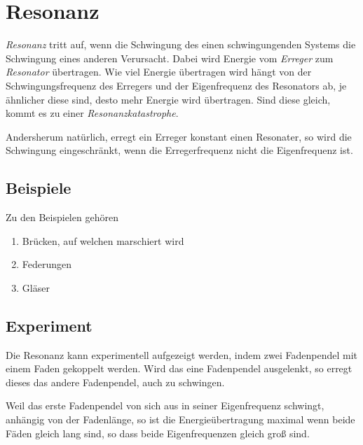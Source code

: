 \documentclass{article}
\begin{document}
\section{Resonanz}
\emph{Resonanz} tritt auf, wenn die Schwingung des einen schwingungenden Systems die Schwingung eines anderen Verursacht. Dabei wird Energie vom \emph{Erreger} zum \emph{Resonator} übertragen. Wie viel Energie übertragen wird hängt von der Schwingungsfrequenz des Erregers und der Eigenfrequenz des Resonators ab, je ähnlicher diese sind, desto mehr Energie wird übertragen. Sind diese gleich, kommt es zu einer \emph{Resonanzkatastrophe}.
 
Andersherum natürlich, erregt ein Erreger konstant einen Resonater, so wird die Schwingung eingeschränkt, wenn die Erregerfrequenz nicht die Eigenfrequenz ist.
 
\subsection{Beispiele}
Zu den Beispielen gehören
\begin{enumerate}
 \item Brücken, auf welchen marschiert wird 
 \item Federungen
 \item Gläser 
\end{enumerate}
 
\subsection{Experiment}
Die Resonanz kann experimentell aufgezeigt werden, indem zwei Fadenpendel mit einem Faden gekoppelt werden. Wird das eine Fadenpendel ausgelenkt, so erregt dieses das andere Fadenpendel, auch zu schwingen.
 
Weil das erste Fadenpendel von sich aus in seiner Eigenfrequenz schwingt, anhängig von der Fadenlänge, so ist die Energieübertragung maximal wenn beide Fäden gleich lang sind, so dass beide Eigenfrequenzen gleich groß sind.
\end{document}

